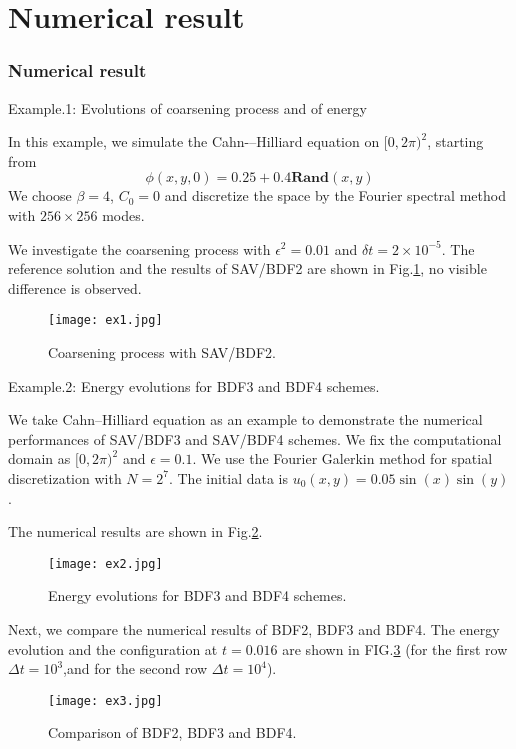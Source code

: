 \documentclass{beamer}
\begin{document}
\section{Numerical result}
\begin{frame}[allowframebreaks]
    \frametitle{Numerical result}

    Example.1: Evolutions of coarsening process and of energy
    
    In this example, we simulate the Cahn-–Hilliard equation on $[0,2\pi)^2$, starting from
\begin{equation}
\phi(x,y,0)=0.25+0.4\textbf{Rand}(x,y)
\end{equation}
We choose $\beta=4$, $C_0=0$ and discretize the space by the Fourier spectral method with $256\times 256$ modes.

We investigate the coarsening process with $\epsilon^2=0.01$ and $\delta t=2\times 10^{-5}$. The reference solution and the results of SAV/BDF2 are shown in Fig.\ref{fig:1}, no visible difference is observed.
        
\begin{figure}[htb]%
	\centering  %
	\texttt{[image: ex1.jpg]}  %
	\caption{Coarsening process with SAV/BDF2.}  %
	\label{fig:1}   %
\end{figure}
    
Example.2: Energy evolutions for BDF3 and BDF4 schemes.

We take Cahn--Hilliard equation as an example to demonstrate the numerical performances of SAV/BDF3 and SAV/BDF4 schemes. We fix the computational domain as $[0,2\pi)^2$ and $\epsilon=0.1$. We use the Fourier Galerkin method for spatial discretization with $N=2^7$. The initial data is $u_0(x,y)=0.05\sin(x)\sin(y)$.

The numerical results are shown in Fig.\ref{fig:2}.

\begin{figure}[htb]%
	\centering  %
	\texttt{[image: ex2.jpg]}  %
	\caption{Energy evolutions for BDF3 and BDF4 schemes.}  %
	\label{fig:2}   %
\end{figure}

Next, we compare the numerical results of BDF2, BDF3 and BDF4. The energy evolution and the configuration at $t=0.016$ are shown in FIG.\ref{fig:3} (for the first row $\Delta t=10^3$,and for the second row $\Delta t=10^4$).

\begin{figure}[htb]%
	\centering  %
	\texttt{[image: ex3.jpg]}  %
	\caption{Comparison of BDF2, BDF3 and BDF4.}  %
	\label{fig:3}   %
\end{figure}
\end{frame}
    
\end{document}

